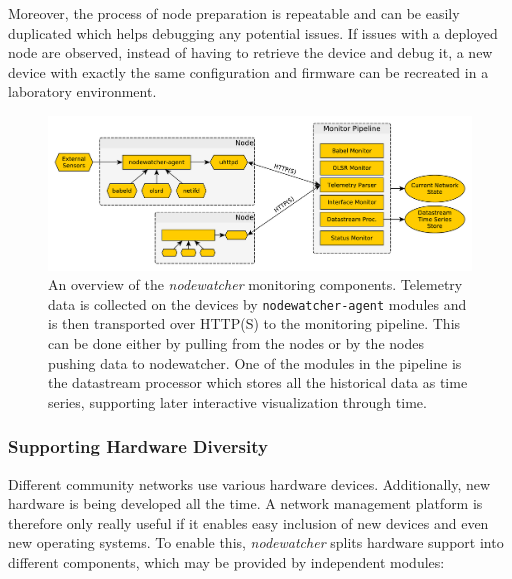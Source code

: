 \documentclass[5p,sort&compress]{elsarticle}
\newcommand{\nodewatcher}{\textit{nodewatcher}}
\begin{document}
Moreover, the process of node preparation is repeatable and can be easily duplicated which helps debugging any potential issues.
If issues with a deployed node are observed, instead of having to retrieve the device and debug it, a new device with exactly the same configuration and firmware can be recreated in a laboratory environment.

\begin{figure}
  \centering
  \includegraphics[scale=0.5]{figures/monitoring-pipeline.pdf}
  \caption{An overview of the \nodewatcher{} monitoring components. Telemetry data is collected on the devices by \texttt{nodewatcher-agent} modules and is then transported over HTTP(S) to the monitoring pipeline. This can be done either by pulling from the nodes or by the nodes pushing data to nodewatcher. One of the modules in the pipeline is the datastream processor which stores all the historical data as time series, supporting later interactive visualization through time.}
  \label{fig:monitoring-pipeline}
\end{figure}

\subsubsection{Supporting Hardware Diversity}

Different community networks use various hardware devices. Additionally, new hardware is being developed all the time.
A network management platform is therefore only really useful if it enables easy inclusion of new devices and even new operating systems.
To enable this, \nodewatcher{} splits hardware support into different components, which may be provided by independent modules:
\end{document}
